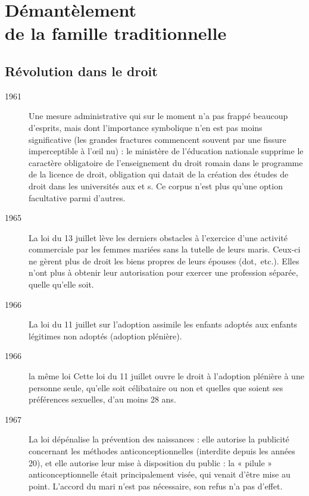

\chapter[Démantèlement de la famille traditionnelle]{Démantèlement\\de la famille traditionnelle}


 

\section{Révolution dans le droit}

\begin{description}

\item[1961] Une mesure administrative qui sur le moment n'a pas frappé beaucoup d'esprits, mais dont l'importance symbolique n'en est pas moins significative (les grandes fractures commencent souvent par une fissure imperceptible à l'œil nu) : le ministère de l'éducation nationale supprime le caractère obligatoire de l'enseignement du droit romain dans le programme de la licence de droit, obligation qui datait de la création des études de droit dans les universités aux  et s. Ce corpus n'est plus qu'une option facultative parmi d'autres. 

\item[1965] La loi du 13 juillet lève les derniers obstacles à l'exercice d'une activité commerciale par les femmes mariées sans la tutelle de leurs maris. Ceux-ci ne gèrent plus de droit les biens propres de leurs épouses (dot,~etc.). Elles n'ont plus à obtenir leur autorisation pour exercer une profession séparée, quelle qu'elle soit.

\item[1966] La loi du 11 juillet sur l'adoption assimile les enfants adoptés aux enfants légitimes non adoptés (adoption plénière). 

\item[1966] la même loi
Cette
loi du 11 juillet ouvre le droit à l'adoption plénière à une personne seule, qu'elle soit célibataire ou non et quelles que soient ses préférences sexuelles, d'au moins 28 ans.

\item[1967] La loi  dépénalise la prévention des naissances : elle autorise la publicité concernant les méthodes anticonceptionnelles (interdite depuis les années 20), et elle autorise leur mise à disposition du public :
la « pilule » anticonceptionnelle était principalement visée,
qui venait d'être mise au point. L'accord du mari n'est pas nécessaire, son refus n'a pas d'effet.


\end{description}
